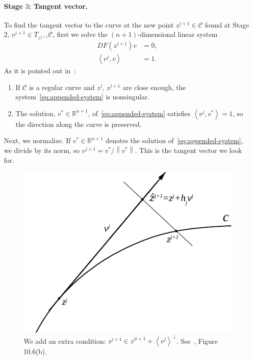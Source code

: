 \documentclass[11pt,reqno,twoside]{article}
\newcommand{\R}{\ensuremath{\mathbb{R}}}
\theoremstyle{remark}
\begin{document}
\paragraph{Stage $3$: Tangent vector.} To find the tangent vector to the
curve at the new point $z^{j+1}\in\mathcal{C}$ found at Stage
$2$, $v^{j+1}\in  T_{z^{j+1}}\mathcal{C}$, first we solve the
$(n+1)$-dimensional linear system
    \begin{equation}\label{eq:appended-system}
      \begin{split}
      DF\left(z^{j+1}\right)v &= 0,\\
      \left\langle v^{j}, v \right\rangle &= 1. 
    \end{split}
  \end{equation}
  As it is pointed out in~\cite{Kuznetsov2004}:
  \begin{enumerate}[label = \emph{(\roman*)}]
    \item If $\mathcal{C}$ is a regular curve and $z^{j}$, $z^{j+1}$ are close
  enough, the system~\eqref{eq:appended-system} is nonsingular.
    \item The solution, $v^{\ast}\in\R^{n+1}$,
  of~\eqref{eq:appended-system} satisfies $\left\langle v^{j},
  v^{\ast}\right\rangle = 1$, so the direction along the curve is
  preserved.
\end{enumerate}
Next, we normalize. If $v^{\ast}\in\R^{n+1}$ denotes the solution
of~\eqref{eq:appended-system}, we divide by its norm, so $v^{j+1} =
v^{\ast}/\left\|v^{\ast}\right\|$. This is the tangent vector we look for. 

\begin{figure}[!t]
  \centering
  \includegraphics[scale=1.0]{arcstep}
  \caption{We add an extra condition: $z^{j+1}\in
  \hat{z}^{ji+1} + \left\langle v^{j}\right\rangle^{\perp}$.
See~\cite{Kuznetsov2004}, Figure 10.6(b).\label{fig:pseudo-arc}}
\end{figure}
\end{document}
